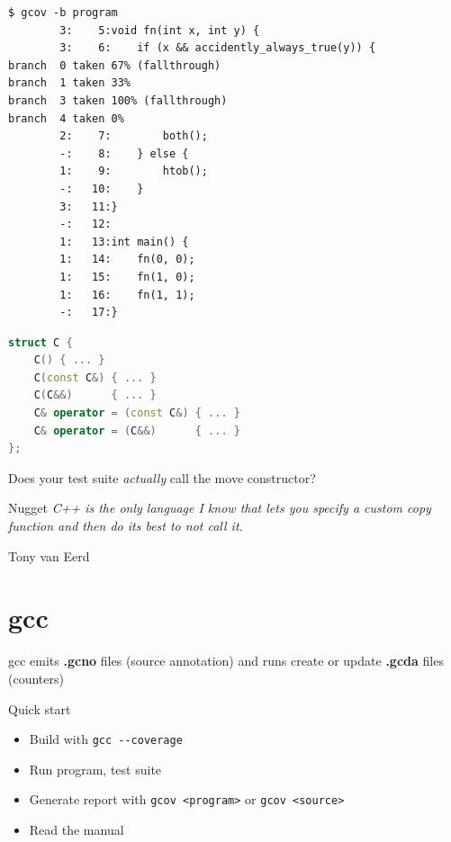 \documentclass[xcolor = {dvipsnames, table}, aspectratio=169]{beamer}
\begin{document}
\begin{frame}[fragile]
    \begin{lstlisting}[basicstyle=\scriptsize\ttfamily]
        $ gcov -b program
        3:    5:void fn(int x, int y) {
        3:    6:    if (x && accidently_always_true(y)) {
branch  0 taken 67% (fallthrough)
branch  1 taken 33%
branch  3 taken 100% (fallthrough)
branch  4 taken 0%
        2:    7:        both();
        -:    8:    } else {
        1:    9:        htob();
        -:   10:    }
        3:   11:}
        -:   12:
        1:   13:int main() {
        1:   14:    fn(0, 0);
        1:   15:    fn(1, 0);
        1:   16:    fn(1, 1);
        -:   17:}
    \end{lstlisting}
\end{frame}

\begin{frame}[fragile]
    \begin{block}{}
        \begin{lstlisting}[language = C++, basicstyle=\scriptsize\ttfamily]
struct C {
    C() { ... }
    C(const C&) { ... }
    C(C&&)      { ... }
    C& operator = (const C&) { ... }
    C& operator = (C&&)      { ... }
};
        \end{lstlisting}
    \end{block}

    \pause
    Does your test suite \emph{actually} call the move constructor?
\end{frame}

\begin{frame}
    \begin{block}{Nugget}
        \emph{C++ is the only language I know that lets you specify a custom
        copy function and then do its best to not call it.}
    \end{block}
    Tony van Eerd
\end{frame}

\section{gcc}

\begin{frame}
    gcc emits \textbf{.gcno} files (source annotation) and runs create or
    update \textbf{.gcda} files (counters)
\end{frame}

\begin{frame}
    \begin{block}{Quick start}
        \begin{itemize}
            \item Build with \lstinline{gcc --coverage}
            \item Run program, test suite
            \item Generate report with \lstinline{gcov <program>} or
                \lstinline{gcov <source>}
            \item Read the manual
        \end{itemize}
    \end{block}
\end{frame}
\end{document}
